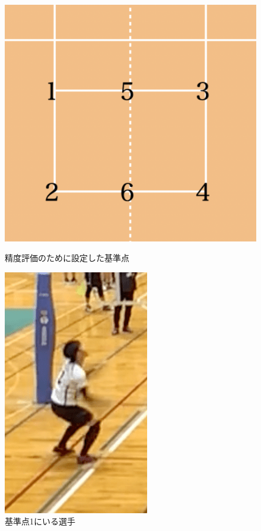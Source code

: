 \documentclass[a4j, fleqn, 12pt]{jsreport}
\begin{document}
        \begin{figure}[ht]
            \begin{minipage}{0.49\hsize}
                \centering
                \includegraphics[width=1\hsize]{images/points.png}
                \caption{精度評価のために設定した基準点}
                \label{fig:points}
            \end{minipage}
            \begin{minipage}{0.49\hsize}
                \centering
                \includegraphics[width=0.7\hsize]{images/appeared.png}
                \caption{基準点1にいる選手}
                \label{fig:on_point}
            \end{minipage}
        \end{figure}
\end{document}
